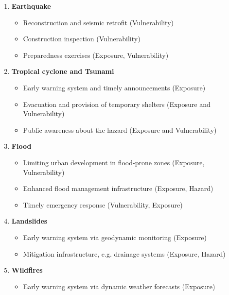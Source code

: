 \documentclass[utf8]{frontiersSCNS} %
\begin{document}
\begin{enumerate}

    \item \textbf{Earthquake}
    \begin{itemize}
            \item Reconstruction and seismic retrofit (Vulnerability)
            \item Construction inspection (Vulnerability)
            \item Preparedness exercises (Exposure, Vulnerability)
    \end{itemize}
    
    \item \textbf{Tropical cyclone and Tsunami}
    \begin{itemize}
            \item Early warning system and timely announcements (Exposure)
            \item Evacuation and provision of temporary shelters (Exposure and Vulnerability)
            \item Public awareness about the hazard (Exposure and Vulnerability)
    \end{itemize}
    
    \item \textbf{Flood}
    \begin{itemize}
            \item Limiting urban development in flood-prone zones (Exposure, Vulnerability)
            \item Enhanced flood management infrastructure (Exposure, Hazard)
            \item Timely emergency response (Vulnerability, Exposure)
    \end{itemize}

    \item \textbf{Landslides}
    \begin{itemize}
            \item Early warning system via geodynamic monitoring (Exposure)
            \item Mitigation infrastructure, e.g. drainage systems (Exposure, Hazard)
    \end{itemize}

    \item \textbf{Wildfires}
    \begin{itemize}
            \item Early warning system via dynamic weather forecasts (Exposure)
    \end{itemize}

\end{enumerate}
\end{document}
